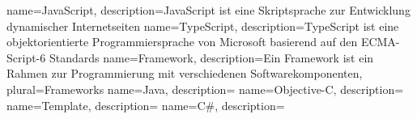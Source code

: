 
{
	name=JavaScript,
	description={JavaScript ist eine Skriptsprache zur Entwicklung dynamischer Internetseiten}
}
{
	name=TypeScript,
	description={TypeScript ist eine objektorientierte Programmiersprache von Microsoft basierend auf den ECMA-Script-6 Standards}
}
{
	name=Framework,
	description={Ein Framework ist ein Rahmen zur Programmierung mit verschiedenen Softwarekomponenten},
	plural=Frameworks
}
{
	name=Java,
	description={}
}
{
	name=Objective-C,
	description={}
}
{
	name=Template,
	description={}
}
{
	name=C\#,
	description={}
}

